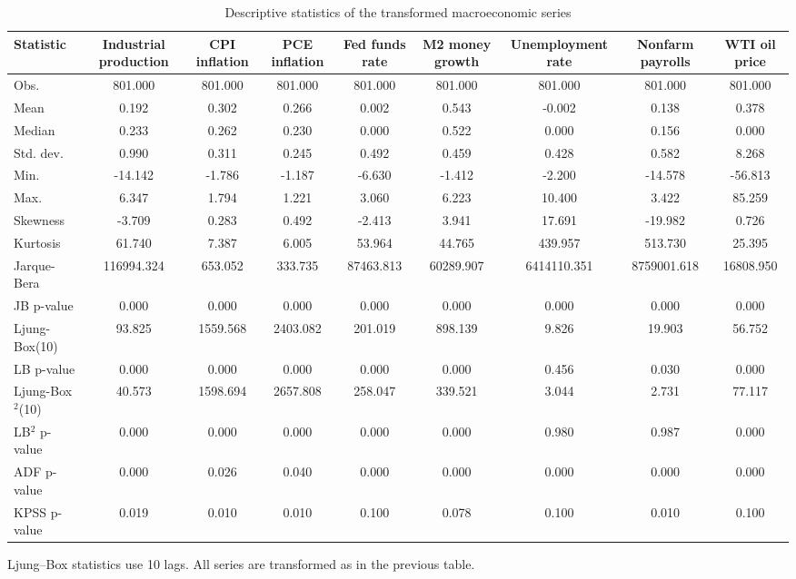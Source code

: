 \begin{table}[htbp]
\centering
\caption{Descriptive statistics of the transformed macroeconomic series}
\label{tab:macrodesc}
\small
\begin{tabular}{lcccccccc}
\toprule
Statistic & Industrial production & CPI inflation & PCE inflation & Fed funds rate & M2 money growth & Unemployment rate & Nonfarm payrolls & WTI oil price \\
\midrule
Obs. & 801.000 & 801.000 & 801.000 & 801.000 & 801.000 & 801.000 & 801.000 & 801.000 \\
Mean & 0.192 & 0.302 & 0.266 & 0.002 & 0.543 & -0.002 & 0.138 & 0.378 \\
Median & 0.233 & 0.262 & 0.230 & 0.000 & 0.522 & 0.000 & 0.156 & 0.000 \\
Std. dev. & 0.990 & 0.311 & 0.245 & 0.492 & 0.459 & 0.428 & 0.582 & 8.268 \\
Min. & -14.142 & -1.786 & -1.187 & -6.630 & -1.412 & -2.200 & -14.578 & -56.813 \\
Max. & 6.347 & 1.794 & 1.221 & 3.060 & 6.223 & 10.400 & 3.422 & 85.259 \\
Skewness & -3.709 & 0.283 & 0.492 & -2.413 & 3.941 & 17.691 & -19.982 & 0.726 \\
Kurtosis & 61.740 & 7.387 & 6.005 & 53.964 & 44.765 & 439.957 & 513.730 & 25.395 \\
Jarque-Bera & 116994.324 & 653.052 & 333.735 & 87463.813 & 60289.907 & 6414110.351 & 8759001.618 & 16808.950 \\
JB p-value & 0.000 & 0.000 & 0.000 & 0.000 & 0.000 & 0.000 & 0.000 & 0.000 \\
Ljung-Box(10) & 93.825 & 1559.568 & 2403.082 & 201.019 & 898.139 & 9.826 & 19.903 & 56.752 \\
LB p-value & 0.000 & 0.000 & 0.000 & 0.000 & 0.000 & 0.456 & 0.030 & 0.000 \\
Ljung-Box$^2$(10) & 40.573 & 1598.694 & 2657.808 & 258.047 & 339.521 & 3.044 & 2.731 & 77.117 \\
LB$^2$ p-value & 0.000 & 0.000 & 0.000 & 0.000 & 0.000 & 0.980 & 0.987 & 0.000 \\
ADF p-value & 0.000 & 0.026 & 0.040 & 0.000 & 0.000 & 0.000 & 0.000 & 0.000 \\
KPSS p-value & 0.019 & 0.010 & 0.010 & 0.100 & 0.078 & 0.100 & 0.010 & 0.100 \\
\bottomrule
\end{tabular}

\begin{minipage}{\linewidth}\footnotesize
Ljung--Box statistics use 10 lags.  All series are transformed as in the previous table.
\end{minipage}
\end{table}
